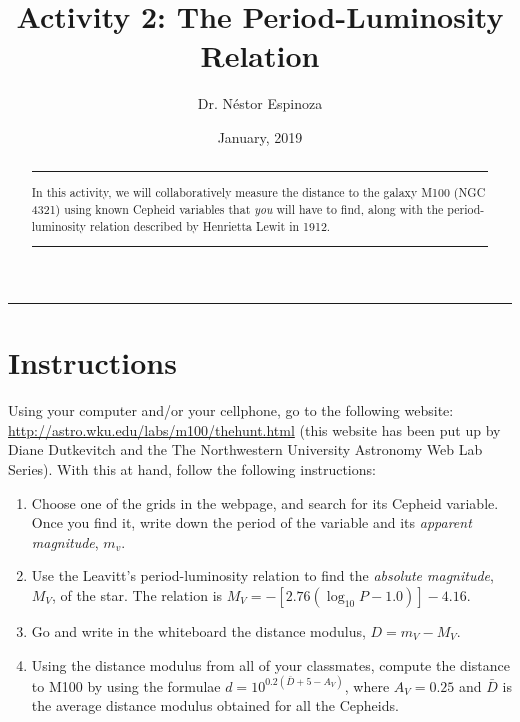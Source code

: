 \documentclass{tufte-handout}
\title{Activity 2: The Period-Luminosity Relation}
\author[Dr. N\'estor Espinoza]{Dr. N\'estor Espinoza}
\date{January, 2019}  %
\begin{document}
\noindent\textcolor{Red}{\rule{16cm}{3mm}}

{\let\newpage\relax\maketitle}

\begin{abstract}
\noindent\textcolor{Red}{\rule{10cm}{0.4mm}}
\noindent In this activity, we will collaboratively measure the distance to the 
galaxy M100 (NGC 4321) using known Cepheid variables that \textit{you} will have to find, 
along with the period-luminosity relation described by Henrietta Lewit in 1912.

\noindent\textcolor{Red}{\rule{10cm}{0.4mm}}
\end{abstract}


\section{Instructions}\label{sec:intro}
\begin{fullwidth}
Using your computer and/or your cellphone, go to the following website: \url{http://astro.wku.edu/labs/m100/thehunt.html} 
(this website has been put up by Diane Dutkevitch and the The Northwestern University Astronomy Web Lab Series). With this 
at hand, follow the following instructions:

\begin{enumerate}
\item Choose one of the grids in the webpage, and search for its Cepheid variable. Once you find it, write down the period of 
the variable and its \textit{apparent magnitude}, $m_v$.
\item Use the Leavitt's period-luminosity relation to find the \textit{absolute magnitude}, $M_V$, of the star. The relation is 
$M_V = -[2.76(\log_{10}P - 1.0)] - 4.16$.
\item Go and write in the whiteboard the distance modulus, $D = m_V-M_V$.
\item Using the distance modulus from all of your classmates, compute the distance to M100 by using the formulae $d = 10^{0.2(\bar{D}+5-A_V)}$, where $A_V = 0.25$ and $\bar{D}$ is the average distance modulus obtained for all the Cepheids.
\end{enumerate}

\end{fullwidth}
\end{document}
